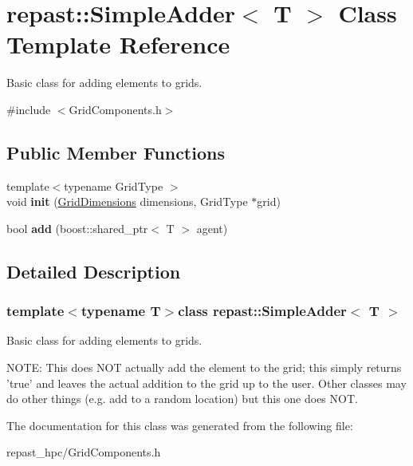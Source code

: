 \hypertarget{classrepast_1_1_simple_adder}{\section{repast\-:\-:Simple\-Adder$<$ T $>$ Class Template Reference}
\label{classrepast_1_1_simple_adder}
}


Basic class for adding elements to grids.  




{\ttfamily \#include $<$Grid\-Components.\-h$>$}

\subsection*{Public Member Functions}
\begin{DoxyCompactItemize}
\item 
\hypertarget{classrepast_1_1_simple_adder_ae09aef02184c1498f6c23bda844ef946}{{\footnotesize template$<$typename Grid\-Type $>$ }\\void {\bfseries init} (\hyperlink{classrepast_1_1_grid_dimensions}{Grid\-Dimensions} dimensions, Grid\-Type $\ast$grid)}\label{classrepast_1_1_simple_adder_ae09aef02184c1498f6c23bda844ef946}

\item 
\hypertarget{classrepast_1_1_simple_adder_a2feb433e1f9889b7b49cf2d0cd461ee7}{bool {\bfseries add} (boost\-::shared\-\_\-ptr$<$ T $>$ agent)}\label{classrepast_1_1_simple_adder_a2feb433e1f9889b7b49cf2d0cd461ee7}

\end{DoxyCompactItemize}


\subsection{Detailed Description}
\subsubsection*{template$<$typename T$>$class repast\-::\-Simple\-Adder$<$ T $>$}

Basic class for adding elements to grids. 

N\-O\-T\-E\-: This does N\-O\-T actually add the element to the grid; this simply returns 'true' and leaves the actual addition to the grid up to the user. Other classes may do other things (e.\-g. add to a random location) but this one does N\-O\-T. 

The documentation for this class was generated from the following file\-:\begin{DoxyCompactItemize}
\item 
repast\-\_\-hpc/Grid\-Components.\-h\end{DoxyCompactItemize}
